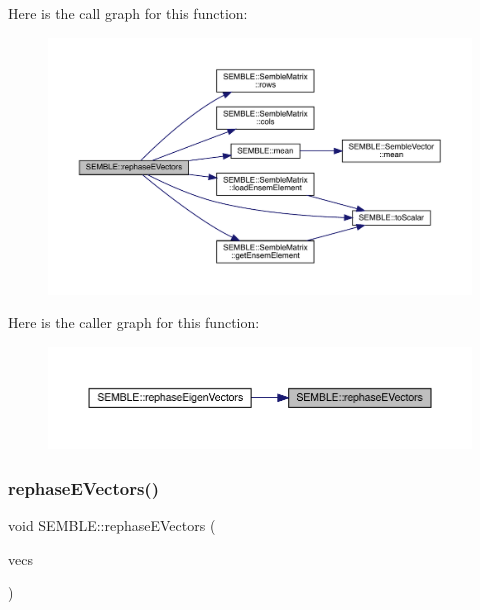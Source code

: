 Here is the call graph for this function\+:
\nopagebreak
\begin{figure}[H]
\begin{center}
\leavevmode
\includegraphics[width=350pt]{d7/dfd/namespaceSEMBLE_af53ad989d18f8aab4666dab37495120d_cgraph}
\end{center}
\end{figure}
Here is the caller graph for this function\+:
\nopagebreak
\begin{figure}[H]
\begin{center}
\leavevmode
\includegraphics[width=350pt]{d7/dfd/namespaceSEMBLE_af53ad989d18f8aab4666dab37495120d_icgraph}
\end{center}
\end{figure}
\mbox{\label{namespaceSEMBLE_a8e644f5b26af596a30e065f17bededc1}} 
\subsubsection{\texorpdfstring{rephaseEVectors()}{rephaseEVectors()}\hspace{0.1cm}{\footnotesize\ttfamily [2/2]}}
{\footnotesize\ttfamily void S\+E\+M\+B\+L\+E\+::rephase\+E\+Vectors (\begin{DoxyParamCaption}\item[{\mbox{\hyperlink{structSEMBLE_1_1SembleMatrix}{Semble\+Matrix}}$<$ std\+::complex$<$ double $>$ $>$ \&}]{vecs }\end{DoxyParamCaption})}


